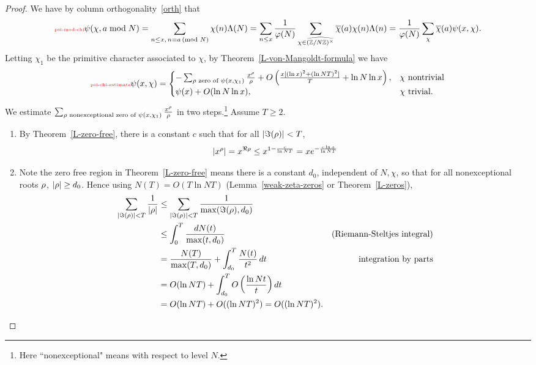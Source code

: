 \begin{proof}
We have by column orthogonality~\ref{orth} that
\begin{equation}\llabel{psi-mod-chi}
\psi(\chi,a\bmod N)=
\sum_{n\le x,\,n\equiv a\md N}\chi(n)\La(N)
=\sum_{n\le x}\rc{\ph(N)}\sum_{\chi\in \widehat{(\Z/N\Z)^{\times}}}\ol{\chi}(a) \chi(n) \La(n)
=\rc{\ph(N)}\sum_{\chi} \ol{\chi}(a)\psi(x,\chi).
\end{equation}
Letting $\chi_1$ be the primitive character associated to $\chi$, by Theorem~\ref{L-von-Mangoldt-formula} we have
\begin{equation}\llabel{psi-chi-estimate}
\psi(x,\chi)=\begin{cases}
-\sum_{\rho\text{ zero of }\psi(x,\chi_1)} \frac{x^{\rh}}{\rh} +O
\pa{
\frac{x[(\ln x)^2+(\ln NT)^2]}{T}+\ln N\ln x} ,&\chi\text{ nontrivial}\\
\psi(x)+O(\ln N\ln x),&\chi\text{ trivial}.
\end{cases}
\end{equation}
We estimate $\sum_{\rho\text{ nonexceptional zero of }\psi(x,\chi_1)} \frac{x^{\rho}}{\rho}$ in two steps.\footnote{Here ``nonexceptional" means with respect to level $N$.} %
Assume $T\ge 2$.
\begin{enumerate}
\item By Theorem~\ref{L-zero-free}, there is a constant $c$ such that for all $|\Im(\rho)|<T$,
\[
|x^{\rho}|=x^{\Re\rho}\le x^{1-\frac{c}{\ln NT}}=xe^{-\frac{c\ln x}{\ln NT}}
\]
\item Note the zero free region in Theorem~\ref{L-zero-free} means there is a constant $d_0$, independent of $N,\chi$, so that for all nonexceptional roots $\rho$, $|\rho|\ge d_0$. Hence using $N(T)=O(T\ln NT)$ (Lemma~\ref{weak-zeta-zeros} or Theorem~\ref{L-zeros}),
\begin{align*}
\sum_{|\Im(\rho)|<T}\frac{1}{\left| {\rho} \right|}
&\le \sum_{|\Im(\rho)|<T}\frac{1}{\max(\Im(\rho),d_0)}\\
&\le \int_0^{T} \frac{dN(t)}{\max(t,d_0)}&\text{(Riemann-Steltjes integral)}\\
&= \frac{N(T)}{\max(T,d_0)}+\int_{d_0}^T \frac{N(t)}{t^2}\,dt
&\text{integration by parts}\\
&=O(\ln NT)+\int_{d_0}^T O\left( {\frac{\ln Nt}{t}} \right)dt\\
&=O(\ln NT)+O((\ln NT)^2)=O((\ln NT)^2).
\end{align*}
\end{enumerate}

\end{proof}

